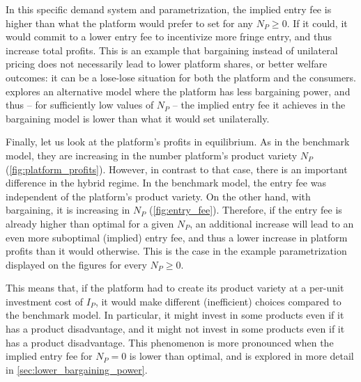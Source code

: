 \documentclass[a4paper]{article}
\begin{document}
In this specific demand system and parametrization, the implied entry fee is higher than what the platform would prefer to set for any $N_P \geq 0$.
If it could, it would commit to a lower entry fee to incentivize more fringe entry, and thus increase total profits.
This is an example that bargaining instead of unilateral pricing does not necessarily lead to lower platform shares, or better welfare outcomes: it can be a lose-lose situation for both the platform and the consumers.
 explores an alternative model where the platform has less bargaining power, and thus -- for sufficiently low values of $N_P$ -- the implied entry fee it achieves in the bargaining model is lower than what it would set unilaterally.

Finally, let us look at the platform's profits in equilibrium.
As in the benchmark model, they are increasing in the number platform's product variety $N_P$ (\cref{fig:platform_profits}). %
However, in contrast to that case, there is an important difference in the hybrid regime.
In the benchmark model, the entry fee was independent of the platform's product variety.
On the other hand, with bargaining, it is increasing in $N_P$ (\cref{fig:entry_fee}).
Therefore, if the entry fee is already higher than optimal for a given $N_P$, an additional increase will lead to an even more suboptimal (implied) entry fee, and thus a lower increase in platform profits than it would otherwise.
This is the case in the example parametrization displayed on the figures for every $N_P \geq 0$.

This means that, if the platform had to create its product variety at a per-unit investment cost of $I_P$, it would make different (inefficient) choices compared to the benchmark model.
In particular, it might invest in some products even if it has a product disadvantage, and it might not invest in some products even if it has a product disadvantage.
This phenomenon is more pronounced when the implied entry fee for $N_P = 0$ is lower than optimal, and is explored in more detail in \cref{sec:lower_bargaining_power}.
\end{document}
